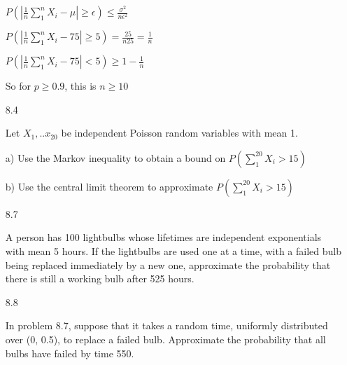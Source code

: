 \documentclass[11pt]{article}
\begin{document}
\begin{itemize}
		$P(|\frac{1}{n} \sum_{1}^{n} X_i
		- \mu| \geq \epsilon) \leq \frac{\sigma^2}{n\epsilon^2}$

		$P(|\frac{1}{n}\sum_{1}^{n} X_i - 75| \geq 5) =
		\frac{25}{n25} = \frac{1}{n}$

		$P(|\frac{1}{n}\sum_{1}^{n} X_i - 75| < 5) \geq
		1 - \frac{1}{n}$

		So for $p \geq 0.9$, this is $n \geq 10$

	\item[8.4]
		
		Let $X_1, ..x_{20}$ be independent Poisson random 
		variables with mean 1.

		a) Use the Markov inequality to obtain a bound on
		$P(\sum_{1}^{20} X_i > 15)$

		b) Use the central limit theorem to approximate
		$P(\sum_1^{20} X_i > 15)$

	\item[8.7]

		A person has 100 lightbulbs whose lifetimes are 
		independent exponentials with mean 5 hours.
		If the lightbulbs are used one at a time, with
		a failed bulb being replaced immediately by a new one,
		approximate the probability that there is still a
		working bulb after 525 hours.

	\item[8.8]

		In problem 8.7, suppose that it takes a random time,
		uniformly distributed over (0, 0.5), to replace a 
		failed bulb. Approximate the probability that all bulbs
		have failed by time 550.

\end{itemize}
\end{document}
